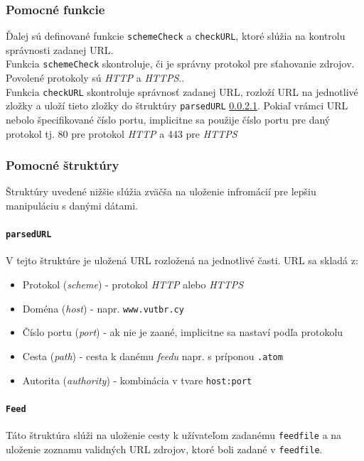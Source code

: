 \documentclass[a4paper, 11pt]{article}
\begin{document}
    \subsubsection{Pomocné funkcie}
    \label{functions}
    Ďalej sú definované funkcie \texttt{schemeCheck} a \texttt{checkURL}, ktoré slúžia na kontrolu správnosti zadanej URL.\\
    Funkcia \texttt{schemeCheck} skontroluje, či je správny protokol pre sťahovanie zdrojov. Povolené protokoly sú \textit{HTTP} a \textit{HTTPS}..\\
    Funkcia \texttt{checkURL} skontroluje správnosť zadanej URL, rozloží URL na jednotlivé zložky a uloží tieto zložky do štruktúry  \texttt{parsedURL} \ref{parsedURL}. Pokiaľ vrámci URL nebolo špecifikované číslo portu, implicitne sa použije číslo portu pre daný protokol tj. 80 pre protokol \textit{HTTP} a 443 pre \textit{HTTPS}

    \subsubsection{Pomocné štruktúry}
    \label{structures}
    Štruktúry uvedené nižšie slúžia zväčša na uloženie infromácií pre lepšiu manipuláciu s danými dátami.	

    \paragraph{\texttt{parsedURL}}
    \label{parsedURL}
    V tejto štruktúre je uložená URL rozložená na jednotlivé časti. URL sa skladá z:
    \begin{itemize}
	\item Protokol (\textit{scheme}) - protokol \textit{HTTP} alebo \textit{HTTPS}
	\item Doména (\textit{host}) - napr. \texttt{www.vutbr.cy}
	\item Číslo portu (\textit{port}) - ak nie je zaané, implicitne sa nastaví podľa protokolu		
	\item Cesta (\textit{path}) - cesta k danému \textit{feedu} napr. s príponou \texttt{.atom}
	\item Autorita (\textit{authority}) - kombinácia v tvare \texttt{host:port}
    \end{itemize}	

    \paragraph{\texttt{Feed}}
    \label{structFeed}
    Táto štruktúra slúži na uloženie cesty k užívateľom zadanému \texttt{feedfile} a na uloženie zoznamu validných URL zdrojov, ktoré boli zadané v \texttt{feedfile}.
\end{document}
